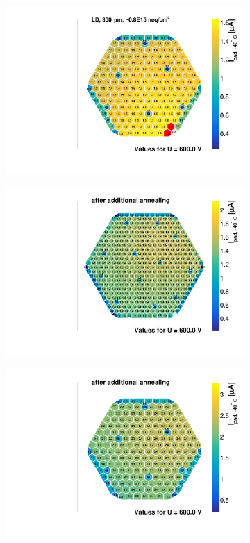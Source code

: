 \begin{figure}
\begin{subfigure}[b]{0.32\textwidth}
		\includegraphics[width=0.999\textwidth]{plots/iv_hexplots/1013.pdf}
		\subcaption{
		}
		\label{plot:iv_hexplot_1013}
	\end{subfigure}
    \hfill
	\begin{subfigure}[b]{0.32\textwidth}
		\includegraphics[width=0.999\textwidth]{plots/iv_hexplots/3009_annealed.pdf}
		\subcaption{
		}
		\label{plot:iv_hexplot_3009_annealed}
	\end{subfigure}
	\hfill
	\begin{subfigure}[b]{0.32\textwidth}
		\includegraphics[width=0.999\textwidth]{plots/iv_hexplots/0541_04_annealed.pdf}

\end{subfigure}
\end{figure}
